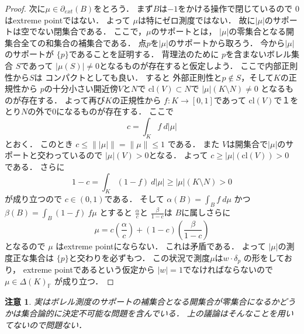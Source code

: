 \documentclass[leqno, a4paper, 12pt]{jsarticle}
\newtheorem*{rmk}{注意}
\newcommand{\cl}{\mathrm{cl}}
\newcommand{\myextreme}[1]{\partial_{ext}(#1)}
\newcommand{\mydiracsetq}[2]{\Delta(#1)_{#2}}
\newcommand{\mygenf}{\mathbb{F}}
\newcommand{\mydirac}[1]{\delta_{#1}}
\begin{document}
\begin{proof}
次に$\mu\in \myextreme{B}$をとろう．
まず$B$は$-1$をかける操作で閉じているので
$0$はextreme pointではない．
よって
$\mu$は特にゼロ測度ではない．
故に$|\mu|$のサポートは空でない閉集合である．
ここで，$\mu$のサポートとは，
$|\mu|$の零集合となる開集合全ての和集合の補集合である．
点$p$を$|\mu|$のサポートから取ろう．
今から$|\mu|$のサポートが
$\{p\}$であることを証明する．
背理法のために
$p$を含まないボレル集合
$S$であって
$|\mu(S)|\neq 0$となるものが存在すると仮定しよう．
ここで内部正則性から$S$は
コンパクトとしても良い．
すると
外部正則性と$p\not \in S$，そして$K$の正規性から
$p$の十分小さい開近傍$V$と$N$で
$\cl(V)\subset N$で
$|\mu|(K\setminus N)\neq 0$
となるものが存在する．
よって再び$K$の正規性から
$f\colon K\to [0, 1]$であって
$\cl(V)$で１をとり$N$の外で$0$になるものが存在する．
ここで
\[
c=\int_{K}f\ d|\mu|
\]
とおく．
このとき
$c\le \||\mu|\|=\|\mu\|\le 1$
である．
また
$V$は開集合で$|\mu|$のサポートと交わっているので
$|\mu|(V)>0$となる．
よって
$c\ge |\mu|(\cl(V))>0$
である．
さらに
\[
1-c=\int_{K}(1-f)\ d|\mu|\ge |\mu|(K\setminus N)>0
\]
が成り立つので
$c\in (0, 1)$である．
そして
$\alpha(B)=\int_{B}f\ d\mu$
かつ
$\beta(B)=\int_{B}(1-f)\ f\mu$
とすると
$\frac{\alpha}{c}$と
$\frac{\beta}{1-c}$は
$B$に属しさらに
\[
\mu=c\left(\frac{\alpha}{c}\right)+(1-c)
\left(\frac{\beta}{1-c}\right)
\]
となるので
$\mu$
はextreme pointにならない．
これは矛盾である．
よって
$|\mu|$の測度正な集合は
$\{p\}$と交わりを必ずもつ．
この状況で測度$\mu$は$w\cdot \mydirac{p}$
の形をしており，
extreme pointであるという仮定から
$|w|=1$でなければならないので
$\mu\in \mydiracsetq{K}{\mygenf}$
が成り立つ．
\end{proof}
\begin{rmk}
実はボレル測度のサポートの補集合となる開集合が零集合になるかどうかは集合論的に決定不可能な問題を含んでいる．
上の議論はそんなことを用いてないので問題ない．
\end{rmk}
\end{document}
